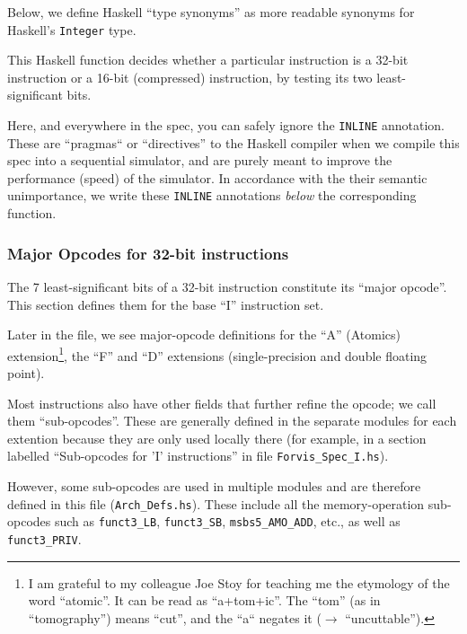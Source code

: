 \documentclass[11pt]{article}
\begin{document}
Below, we define Haskell ``type synonyms'' as more readable synonyms
for Haskell's {\tt Integer} type.



This Haskell function decides whether a particular instruction is a
32-bit instruction or a 16-bit (compressed) instruction, by testing
its two least-significant bits.



Here, and everywhere in the spec, you can safely ignore the
\verb|INLINE| annotation.  These are ``pragmas`` or ``directives'' to
the Haskell compiler when we compile this spec into a sequential
simulator, and are purely meant to improve the performance (speed) of
the simulator.  In accordance with the their semantic unimportance, we
write these \verb|INLINE| annotations \emph{below} the corresponding
function.


\subsubsection{Major Opcodes for 32-bit instructions}

The 7 least-significant bits of a 32-bit instruction constitute its
``major opcode''.  This section defines them for the base ``I''
instruction set.



Later in the file, we see major-opcode definitions for the ``A''
(Atomics) extension\footnote{I am grateful to my colleague Joe Stoy
for teaching me the etymology of the word ``atomic''.  It can be read as
``a+tom+ic''.  The ``tom'' (as in ``tomography'') means ``cut'', and
the ``a`` negates it ($\rightarrow$ ``uncuttable'').}, the ``F'' and
``D'' extensions (single-precision and double floating point).

Most instructions also have other fields that further refine the
opcode; we call them ``sub-opcodes''.  These are generally defined in
the separate modules for each extention because they are only used
locally there (for example, in a section labelled ``Sub-opcodes for
'I' instructions'' in file \verb|Forvis_Spec_I.hs|).

However, some sub-opcodes are used in multiple modules and are
therefore defined in this file (\verb|Arch_Defs.hs|).  These include
all the memory-operation sub-opcodes such as \verb|funct3_LB|,
\verb|funct3_SB|, \verb|msbs5_AMO_ADD|, etc., as well as
\verb|funct3_PRIV|.
\end{document}
